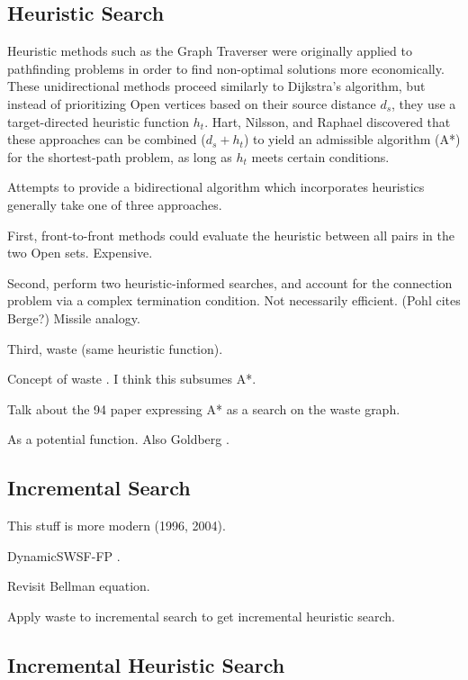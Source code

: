 \documentclass[nobib]{tufte-book}
\newcommand{\cdnote}[1]{{\xxnote{CD}{blue}{#1}}}
\newcommand{\xxnote}[3]{}
\renewcommand{\xxnote}[3]{\color{#2}{#1: #3}}
\begin{document}
\subsection{Heuristic Search}

Heuristic methods such as the Graph Traverser
\citep{doran1966graphtraverser} were originally
applied to pathfinding problems in order to find non-optimal
solutions more economically.
These unidirectional methods proceed similarly to Dijkstra's algorithm,
but instead of prioritizing {\sc Open} vertices
based on their source distance $d_s$,
they use a target-directed heuristic function $h_t$.
Hart, Nilsson, and Raphael \citep{hart1968astar} discovered that
these approaches can be combined ($d_s + h_t$) to yield
an admissible algorithm (A*) for the shortest-path problem,
as long as $h_t$ meets certain conditions.

Attempts to provide a bidirectional algorithm which incorporates
heuristics generally take one of three approaches.
\cdnote{I need to deep-dive here to write this correctly.}

First,
front-to-front methods
could evaluate the heuristic between all pairs in the two
{\sc Open} sets.
Expensive.

Second,
perform two heuristic-informed searches,
and account for the connection problem via a complex
termination condition.
Not necessarily efficient.
(Pohl cites Berge?)
Missile analogy.

Third,
waste (same heuristic function).

Concept of waste \citep{pohl1969bidirectional}.
I think this subsumes A*.

Talk about the 94 paper \citep{ikeda1994betterroutes}
expressing A* as a search on
the waste graph.

As a potential function.
Also Goldberg \citep{goldberg2005spexternalmemory}.

\subsection{Incremental Search}

This stuff is more modern (1996, 2004).

DynamicSWSF-FP \citep{ramalingam1996}.

Revisit Bellman equation.

Apply waste to incremental search to get
incremental heuristic search.

\subsection{Incremental Heuristic Search}
\end{document}
